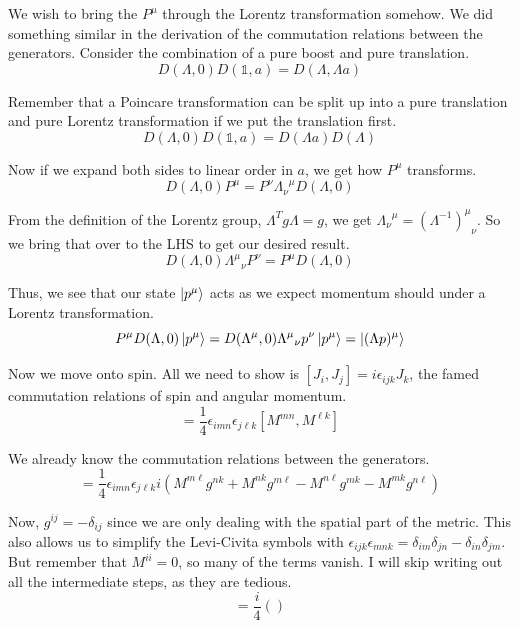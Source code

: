 \documentclass[12pt]{article}
\begin{document}
We wish to bring the $P^\mu$ through the Lorentz transformation somehow. We did something similar in the derivation of the commutation relations between the generators. Consider the combination of a pure boost and pure translation.
\begin{equation}
    D(\Lambda, 0)D(\mathbb{1},a)=D(\Lambda,\Lambda a)
\end{equation}

Remember that a Poincare transformation can be split up into a pure translation and pure Lorentz transformation if we put the translation first.
\begin{equation}
    D(\Lambda,0)D(\mathbb{1},a)=D(\Lambda a)D(\Lambda)
\end{equation}

Now if we expand both sides to linear order in $a$, we get how $P^\mu$ transforms.
\begin{equation}
    D(\Lambda,0)P^\mu =P^\nu {\Lambda_\nu}^\mu D(\Lambda,0)
\end{equation}

From the definition of the Lorentz group, $\Lambda^T g \Lambda=g$, we get ${\Lambda_\nu}^\mu={(\Lambda^{-1})^\mu}_\nu$. So we bring that over to the LHS to get our desired result.
\begin{equation}
    D(\Lambda,0){\Lambda^\mu}_\nu P^\nu =P^\mu D(\Lambda,0)
\end{equation}

Thus, we see that our state $\ket{p^\mu}$ acts as we expect momentum should under a Lorentz transformation.
\begin{equation}
    P^\mu D(\Lambda,0)\ket{p^\mu}=D(\Lambda^\mu,0){\Lambda^\mu}_\nu p^\nu\ket{p^\mu}=\ket{(\Lambda p)^\mu}
\end{equation}

Now we move onto spin. All we need to show is $[J_i,J_j]=i\epsilon_{ijk}J_k$, the famed commutation relations of spin and angular momentum.
\begin{equation}
    [J_i,J_j]=\frac{1}{4}\epsilon_{i m n }\epsilon_{j \ell k}[M^{mn},M^{\ell k}]
\end{equation}

We already know the commutation relations between the generators.
\begin{equation}
    [J_i,J_j]=\frac{1}{4}\epsilon_{i m n }\epsilon_{j \ell k}i(M^{m \ell}g^{n k}+M^{n k}g^{m \ell}-M^{n \ell}g^{m k}-M^{m k}g^{n \ell})
\end{equation}

Now, $g^{ij}=-\delta_{ij}$ since we are only dealing with the spatial part of the metric. This also allows us to simplify the Levi-Civita symbols with $\epsilon_{ijk}\epsilon_{mnk}=\delta_{im}\delta_{jn}-\delta_{in}\delta_{jm}
$. But remember that $M^{ii}=0$, so many of the terms vanish. I will skip writing out all the intermediate steps, as they are tedious.
\begin{equation}
    [J_i,J_j]=\frac{i}{4}()
\end{equation}
\end{document}
